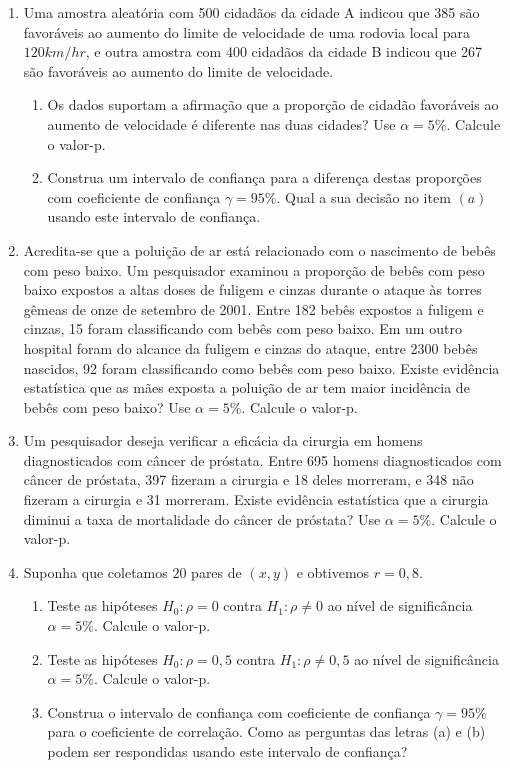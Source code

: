 \documentclass[8pt, a4paper]{article}
\begin{document}
\begin{enumerate}
	\item Uma amostra aleatória com 500 cidadãos da cidade A indicou que 385 são favoráveis ao aumento do limite de velocidade de uma rodovia local para $120 km/hr$, e outra amostra com 400 cidadãos da cidade B indicou que 267 são favoráveis ao aumento do limite de velocidade.
	\begin{enumerate}
		\item Os dados suportam a afirmação que a proporção de cidadão favoráveis ao aumento de velocidade é diferente nas duas cidades? Use $\alpha=5\%$. Calcule o valor-p.
		\item Construa um intervalo de confiança para a diferença destas proporções com coeficiente de confiança $\gamma=95\%$. Qual a sua decisão no item $(a)$ usando este intervalo de confiança.
	\end{enumerate}

	\item Acredita-se que a poluição de ar está relacionado com o nascimento de bebês com peso baixo. Um pesquisador examinou a proporção de bebês com peso baixo expostos a altas doses de fuligem e cinzas durante o ataque às torres gêmeas de onze de setembro de 2001. Entre 182 bebês expostos a fuligem e cinzas, 15 foram classificando com bebês com peso baixo. Em um outro hospital foram do alcance da fuligem e cinzas do ataque, entre 2300 bebês nascidos, 92 foram classificando como bebês com peso baixo. Existe evidência estatística que as mães exposta a poluição de ar tem maior incidência de bebês com peso baixo? Use $\alpha=5\%$. Calcule o valor-p.
	
	\item Um pesquisador deseja verificar a eficácia da cirurgia em homens diagnosticados com câncer de próstata. Entre 695 homens diagnosticados com câncer de próstata, 397 fizeram a cirurgia e 18 deles morreram, e 348 não fizeram a cirurgia e 31 morreram. Existe evidência estatística que a cirurgia diminui a taxa de mortalidade do câncer de próstata? Use $\alpha=5\%$. Calcule o valor-p.
	
	\item Suponha que coletamos $20$ pares de $(x,y)$ e obtivemos $r=0,8$.
	\begin{enumerate}
		\item Teste as hipóteses $H_0: \rho = 0$ contra $H_1: \rho \neq 0$ ao nível de significância $\alpha=5\%$. Calcule o valor-p.
		\item Teste as hipóteses $H_0: \rho = 0,5$ contra $H_1: \rho \neq 0,5$ ao nível de significância $\alpha=5\%$. Calcule o valor-p.
		\item Construa o intervalo de confiança com coeficiente de confiança $\gamma = 95\%$ para o coeficiente de correlação. Como as perguntas das letras (a) e (b) podem ser respondidas usando este intervalo de confiança?
	\end{enumerate}


\end{enumerate}
\end{document}
